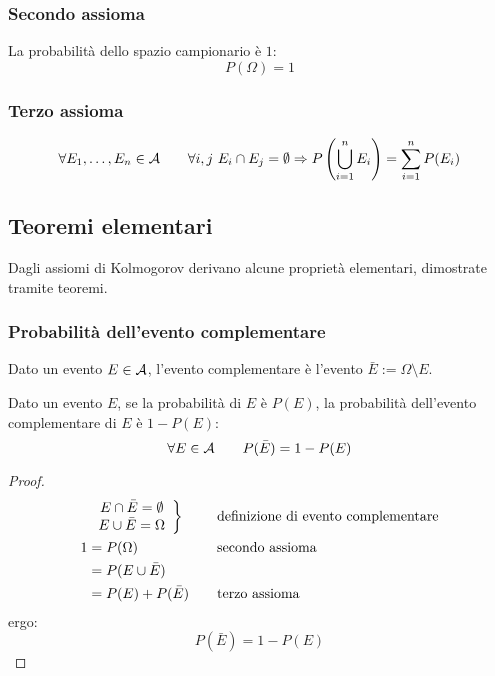 \subsubsection{Secondo assioma}
La probabilità dello spazio campionario è $1$:
\begin{equation*}
	P(\Omega)=1
\end{equation*}


\subsubsection{Terzo assioma}
\begin{equation*}
	\forall E_1,\dots,E_n\in\mathcal A\qquad \forall i,j~E_i\cap E_j = \emptyset \Rightarrow P\left( \bigcup_{i=1}^n E_i \right)=\sum_{i=1}^n P(E_i)
\end{equation*}



\subsection{Teoremi elementari}
Dagli assiomi di Kolmogorov derivano alcune proprietà elementari, dimostrate tramite teoremi.


\subsubsection{Probabilità dell'evento complementare}
Dato un evento $E\in\mathcal A$, l'evento complementare è l'evento $\bar E := \Omega\setminus E$.
\begin{teor} \label{t:probcompl}
	Dato un evento $E$, se la probabilità di $E$ è $P(E)$, la probabilità dell'evento complementare di $E$ è $1-P(E)$:
	\begin{equation*}
		\forall E\in\mathcal A\qquad P(\bar E)=1-P(E)
	\end{equation*}
\end{teor}
\begin{proof}
	\begin{align*}
		  & \left.
		\begin{array}{cc}
			E\cap\bar E=\emptyset \\
			E\cup\bar E=\Omega
		\end{array} \right\}  & \quad & \text{definizione di evento complementare} \\
		1 & = P(\Omega)        & \quad & \text{secondo assioma}                                  \\
		  & = P(E\cup\bar E)                                                         \\
		  & = P(E)+P(\bar E)   & \quad & \text{terzo assioma}
	\end{align*}
	ergo:
	\begin{equation*}
		P(\bar E)=1-P(E)
	\end{equation*}
\end{proof}

